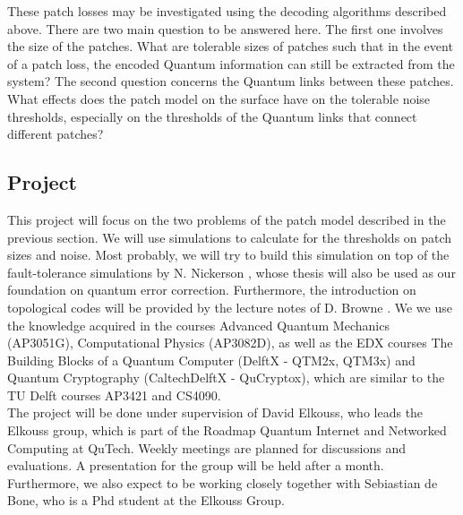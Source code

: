 These patch losses may be investigated using the decoding algorithms described above. There are two main question to be answered here. The first one involves the size of the patches. What are tolerable sizes of patches such that in the event of a patch loss, the encoded Quantum information can still be extracted from the system? The second question concerns the Quantum links between these patches. What effects does the patch model on the surface have on the tolerable noise thresholds, especially on the thresholds of the Quantum links that connect different patches?

\subsection*{Project}
This project will focus on the two problems of the patch model described in the previous section. We will use simulations to calculate for the thresholds on patch sizes and noise. Most probably, we will try to build this simulation on top of the fault-tolerance simulations by N. Nickerson \cite{naomi}, whose thesis will also be used as our foundation on quantum error correction. Furthermore, the introduction on topological codes will be provided by the lecture notes of D. Browne \cite{browne}. We we use the knowledge acquired in the courses Advanced Quantum Mechanics (AP3051G), Computational Physics (AP3082D), as well as the EDX courses The Building Blocks of a Quantum Computer (DelftX - QTM2x, QTM3x) and Quantum Cryptography (CaltechDelftX - QuCryptox), which are similar to the TU Delft courses AP3421 and CS4090. \\

The project will be done under supervision of David Elkouss, who leads the Elkouss group, which is part of the Roadmap Quantum Internet and Networked Computing at QuTech. Weekly meetings are planned for discussions and evaluations. A presentation for the group will be held after a month. Furthermore, we also expect to be working closely together with Sebiastian de Bone, who is a Phd student at the Elkouss Group.\\

